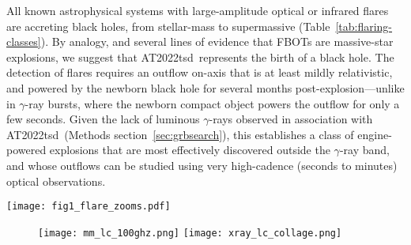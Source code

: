 \documentclass{nature_plusfigure}
\newcommand{\at}{AT2022tsd}
\begin{document}
All known astrophysical systems with large-amplitude optical or infrared flares are accreting black holes, from stellar-mass to supermassive (Table~\ref{tab:flaring-classes}). By analogy, and several lines of evidence that FBOTs are massive-star explosions, we suggest that \at\ represents the birth of a black hole.
The detection of flares requires an outflow on-axis that is at least mildly relativistic, and powered by the newborn black hole for several months post-explosion---unlike in $\gamma$-ray bursts, where the newborn compact object powers the outflow for only a few seconds. Given the lack of luminous $\gamma$-rays observed in association with \at\ (Methods section~\ref{sec:grbsearch}), this establishes a class of engine-powered explosions that are most effectively discovered outside the $\gamma$-ray band, and whose outflows can be studied using very high-cadence (seconds to minutes) optical observations.

\newpage

\begin{figure*}
\centering
    \texttt{[image: fig1\_flare\_zooms.pdf]}
\caption{\textbf{\at\ optical light curve.}
  The original transient event (top panel, $\Delta t_\mathrm{obs}<28\,$d) was followed by prominent short-duration (minutes to hours) flares with amplitudes of a few to $100\times$. Measurements have been corrected for Milky Way extinction, and error bars are 1-$\sigma$. Upper limits (3-$\sigma$) are shown as open triangles. A crude cosmological correction has been applied to convert to absolute magnitude. Epochs of follow-up observations (optical spectroscopy, X-ray, and radio) are marked in the top panel. For ULTRASPEC observations, points with S/N$>5$ are filled in, and the $g$-band inset shows the light curve smoothed using a 3-minute running average.}
 \label{fig:optical-lc}
\end{figure*}

\begin{figure*}
\centering
    \begin{subfigure}[t]{1.0\textwidth}
         \centering
         \texttt{[image: mm\_lc\_100ghz.png]}
        \texttt{[image: xray\_lc\_collage.png]}
     \end{subfigure}
\caption{\textbf{Millimeter (left) and X-ray (right) light curves of \at} and other radio-loud luminous fast blue optical transients (LFBOTs) compared to different classes of extragalactic transients: tidal disruption events (TDEs), long-duration gamma-ray bursts (LGRBs), low-luminosity GRBs (LLGRBs), and core-collapse supernovae (CC SNe). The millimeter and X-ray luminosity of LFBOTs resembles relativistic explosions such as LGRBs, and \at\ has the most luminous X-ray emission of any LFBOT to date. The millimeter points for AT2022tsd, and the X-ray points for AT2022tsd and FBOT AT2020xnd, are outlined in black for clarity.}
 \label{fig:mm-xray-lc}
\end{figure*}
\end{document}
